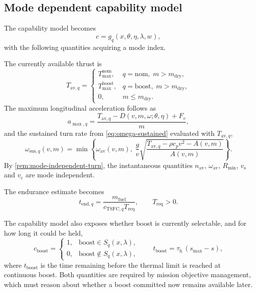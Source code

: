 \documentclass[11pt,a4paper]{article}
\newcommand{\Sset}{S}
\newcommand{\vecx}{x}
\newcommand{\vecw}{w}
\newcommand{\vecc}{c}
\newcommand{\vectheta}{\theta}
\newcommand{\veceta}{\eta}
\newcommand{\veclambda}{\lambda}
\newcommand{\vecg}{g}
\begin{document}
\subsection{Mode dependent capability model}

The capability model becomes
\begin{equation}
  \vecc = \vecg_q(\vecx, \vectheta, \veceta, \veclambda, \vecw),
\end{equation}
with the following quantities acquiring a mode index.

The currently available thrust is
\begin{equation}
  T_{\mathrm{av},q} =
  \begin{cases}
    T^{\mathrm{nom}}_{\max}, & q = \mathrm{nom},\; m > m_{\mathrm{dry}}, \\
    T^{\mathrm{boost}}_{\max}, & q = \mathrm{boost},\; m > m_{\mathrm{dry}}, \\
    0, & m \le m_{\mathrm{dry}} .
  \end{cases}
\end{equation}
The maximum longitudinal acceleration follows as
\begin{equation}
  a_{\max,q} = \frac{T_{\mathrm{av},q} - D(v, m, \omega; \vectheta, \veceta) + F_v}{m},
\end{equation}
and the sustained turn rate from \cref{eq:omega-sustained} evaluated with
$T_{\mathrm{av},q}$,
\begin{equation}
  \omega_{\mathrm{sus},q}(v, m) =
  \min\left\{
    \omega_{\mathrm{av}}(v,m),\;
    \frac{g}{v}
    \sqrt{\frac{T_{\mathrm{av},q} - \rho c_p v^{2} - A(v,m)}{A(v,m)}}
  \right\}.
\end{equation}
By \cref{rem:mode-independent-turn}, the instantaneous quantities
$n_{\mathrm{av}}$, $\omega_{\mathrm{av}}$, $R_{\min}$, $v_{\mathrm{s}}$ and
$v_{\mathrm{c}}$ are mode independent.

The endurance estimate becomes
\begin{equation}
  t_{\mathrm{end},q} =
  \frac{m_{\mathrm{fuel}}}{c_{\mathrm{TSFC},q} T_{\mathrm{req}}},
  \qquad T_{\mathrm{req}} > 0 .
\end{equation}

The capability model also exposes whether boost is currently selectable, and for
how long it could be held,
\begin{equation}
  c_{\mathrm{boost}} =
  \begin{cases}
    1, & \mathrm{boost} \in \Sset_q(\vecx, \veclambda), \\
    0, & \mathrm{boost} \notin \Sset_q(\vecx, \veclambda),
  \end{cases}
  \qquad
  t_{\mathrm{boost}} = \tau_{\mathrm{h}}\,(s_{\max} - s),
  \label{eq:boost-available}
\end{equation}
where $t_{\mathrm{boost}}$ is the time remaining before the thermal limit is
reached at continuous boost. Both quantities are required by mission objective
management, which must reason about whether a boost committed now remains
available later.
\end{document}
